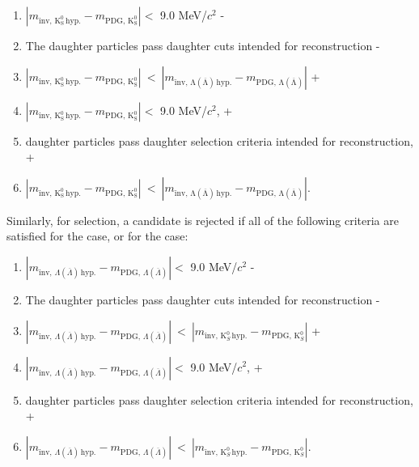  \begin{enumerate}
- \item $\left|m_{\mathrm{inv,\,K^{0}_{S}\,hyp.}} - m_{\mathrm{PDG,\,K^{0}_{S}}}\right| < $ 9.0 MeV/$c^{2}$
- \item The daughter particles pass daughter cuts intended for \Ks reconstruction
- \item $\left|m_{\mathrm{inv,\,K^{0}_{S}\,hyp.}} - m_{\mathrm{PDG,\,K^{0}_{S}}}\right|~ < ~\left|m_{\mathrm{inv,\,\Lambda(\overline{\Lambda})\,hyp.}} - m_{\mathrm{PDG,\,\Lambda(\overline{\Lambda})}}\right|$
+ \item $\left|m_{\mathrm{inv,\,K^{0}_{S}\,hyp.}} - m_{\mathrm{PDG,\,K^{0}_{S}}}\right| < $ 9.0 MeV/$c^{2}$,
+ \item daughter particles pass daughter selection criteria intended for \Ks reconstruction,
+ \item $\left|m_{\mathrm{inv,\,K^{0}_{S}\,hyp.}} - m_{\mathrm{PDG,\,K^{0}_{S}}}\right|~ < ~\left|m_{\mathrm{inv,\,\Lambda(\overline{\Lambda})\,hyp.}} - m_{\mathrm{PDG,\,\Lambda(\overline{\Lambda})}}\right|$.
 \end{enumerate} 
 Similarly, for \Ks selection, a candidate is rejected if all of the following criteria are satisfied for the \Lam case, or for the \ALam case:
 \begin{enumerate}
- \item $\left|m_{\mathrm{inv},\,\Lambda(\overline{\Lambda})\,\mathrm{hyp.}} - m_{\mathrm{PDG},\,\Lambda(\overline{\Lambda})}\right| < $ 9.0 MeV/$c^{2}$
- \item The daughter particles pass daughter cuts intended for \LamALam reconstruction
- \item $\left|m_{\mathrm{inv},\,\Lambda(\overline{\Lambda})\,\mathrm{hyp.}} - m_{\mathrm{PDG},\,\Lambda(\overline{\Lambda})}\right|~ < ~\left|m_{\mathrm{inv},\,\mathrm{K}^{0}_{S}\,\mathrm{hyp.}} - m_{\mathrm{PDG},\,\mathrm{K}^{0}_{S}}\right|$
+ \item $\left|m_{\mathrm{inv},\,\Lambda(\overline{\Lambda})\,\mathrm{hyp.}} - m_{\mathrm{PDG},\,\Lambda(\overline{\Lambda})}\right| < $ 9.0 MeV/$c^{2}$,
+ \item daughter particles pass daughter selection criteria intended for \LamALam reconstruction,
+ \item $\left|m_{\mathrm{inv},\,\Lambda(\overline{\Lambda})\,\mathrm{hyp.}} - m_{\mathrm{PDG},\,\Lambda(\overline{\Lambda})}\right|~ < ~\left|m_{\mathrm{inv},\,\mathrm{K}^{0}_{S}\,\mathrm{hyp.}} - m_{\mathrm{PDG},\,\mathrm{K}^{0}_{S}}\right|$.
 \end{enumerate} 
 
